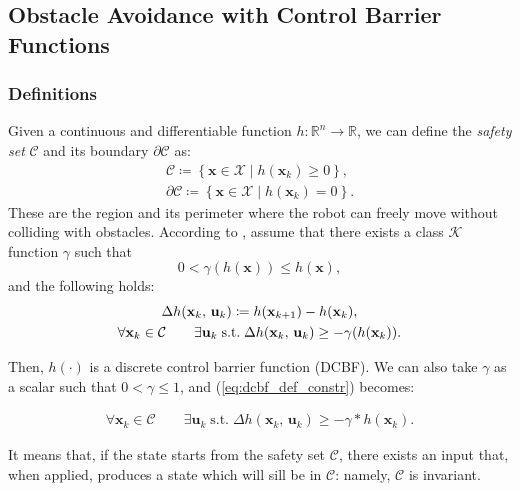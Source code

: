 \subsection{Obstacle Avoidance with Control Barrier Functions}

\subsubsection{Definitions}
Given a continuous and differentiable function $h: \mathbb{R}^n \rightarrow \mathbb{R}$, we can define the \textit{safety set} $\mathcal{C}$ and its boundary $\partial \mathcal{C}$ as:
\begin{equation}
    \begin{aligned}
        \mathcal{C} \coloneqq \left\{ \mathbf{x} \in \mathcal{X} \mid  h(\mathbf{x}_k) \geq 0\right\}, \\
        \partial \mathcal{C} \coloneqq \left\{ \mathbf{x} \in \mathcal{X} \mid  h(\mathbf{x}_k) = 0\right\}.
    \end{aligned}
\end{equation}
These are the region and its perimeter where the robot can freely move without colliding with obstacles.
According to \cite{zeng2021safetycriticalmodelpredictivecontrol}, %
assume that there exists a class $\mathcal{K}$ function $\gamma$ such that
$$
0 < \gamma(h(\mathbf{x})) \leq h(\mathbf{x}),
$$
and the following holds:
\begin{gather}
\Delta h(\mathbf{x}_k,\, \mathbf{u}_k) \coloneqq h(\mathbf{x}_{k+1}) - h(\mathbf{x}_{k}), \notag \\
\forall \mathbf{x}_k \in \mathcal{C} \qquad \exists \mathbf{u}_k \; \text{s.t.} \; \Delta h(\mathbf{x}_k,\, \mathbf{u}_k) \geq -\gamma(h(\mathbf{x}_k)). \label{eq:dcbf_def_constr}
\end{gather}

Then, $h(\cdot)$ is a discrete control barrier function (DCBF). We can also take $\gamma$ as a scalar such that $0 < \gamma \leq 1$, and (\ref{eq:dcbf_def_constr}) becomes:

\begin{gather*}
    \forall \mathbf{x}_k \in \mathcal{C} \qquad \exists \mathbf{u}_k \; \text{s.t.} \; \Delta h(\mathbf{x}_k,\, \mathbf{u}_k) \geq -\gamma * h(\mathbf{x}_k). 
\end{gather*}

It means that, if the state starts from the safety set $\mathcal{C}$, there exists an input that, when applied, produces a state which will sill be in $\mathcal{C}$: namely, $\mathcal{C}$ is invariant. 

